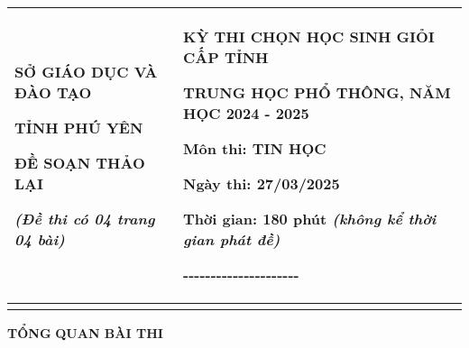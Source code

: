 \documentclass[
]{article}
\author{}
\date{}
\begin{document}
\begin{longtable}[]{@{}
  >{\raggedright\arraybackslash}p{}
  >{\raggedright\arraybackslash}p{}@{}}
\toprule\noalign{}
\begin{minipage}[b]{\linewidth}\centering
\textbf{SỞ GIÁO DỤC VÀ ĐÀO TẠO}

\textbf{TỈNH PHÚ YÊN}

\textbf{ĐỀ SOẠN THẢO LẠI}

\emph{(Đề thi có 04 trang 04 bài)}
\end{minipage} & \begin{minipage}[b]{\linewidth}\centering
\textbf{KỲ THI CHỌN HỌC SINH GIỎI CẤP TỈNH}

\textbf{TRUNG HỌC PHỔ THÔNG, NĂM HỌC 2024 - 2025}

\textbf{Môn thi: TIN HỌC}

\textbf{Ngày thi:} \textbf{27/03/2025}

\textbf{Thời gian:} 180 phút \emph{(không kể thời gian phát đề)}

-\/-\/-\/-\/-\/-\/-\/-\/-\/-\/-\/-\/-\/-\/-\/-\/-\/-\/-\/-\/-
\end{minipage} \\
\midrule\noalign{}
\endhead
\bottomrule\noalign{}
\endlastfoot
\end{longtable}

\textbf{TỔNG} \textbf{QUAN BÀI THI}
\end{document}
